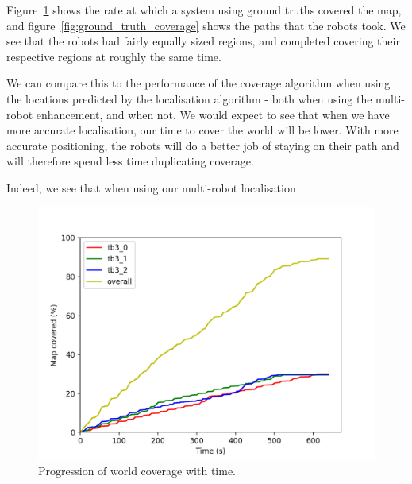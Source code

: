 \documentclass[a4paper, 10pt, conference]{ieeeconf}      %
\begin{document}
Figure~\ref{fig:ground_truth} shows the rate at which a system using ground truths covered the map, and figure~\ref{fig:ground_truth_coverage} shows the paths that the robots took. We see that the robots had fairly equally sized regions, and completed covering their respective regions at roughly the same time.

We can compare this to the performance of the coverage algorithm when using the locations predicted by the localisation algorithm - both when using the multi-robot enhancement, and when not. We would expect to see that when we have more accurate localisation, our time to cover the world will be lower. With more accurate positioning, the robots will do a better job of staying on their path and will therefore spend less time duplicating coverage. 

Indeed, we see that when using our multi-robot localisation

\begin{figure}
	\centering
	\includegraphics[width=\columnwidth]{ground_truth.png}
	\caption{Progression of world coverage with time.}
	\label{fig:ground_truth}
\end{figure}
\end{document}
